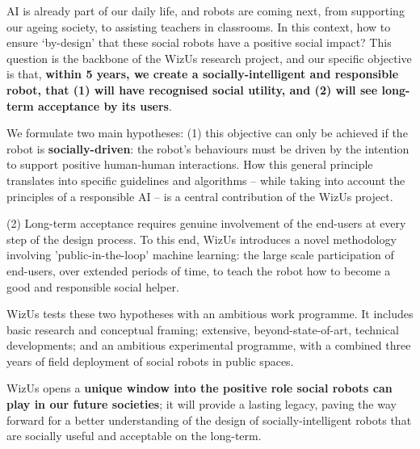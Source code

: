 \documentclass[11pt,a4paper]{report}
\newcommand{\project}{WizUs\xspace}
\begin{document}
AI is already part of our daily life, and robots are coming next, from
supporting our ageing society, to assisting teachers in classrooms. In this
context, how to ensure `by-design' that these social robots have a positive
social impact? This question is the backbone of the \project research project,
and our specific objective is that, \textbf{within 5 years, we create a
socially-intelligent and responsible robot, that (1) will have recognised social
utility, and (2) will see long-term acceptance by its users}.

We formulate two main hypotheses: (1) this objective can only be achieved if the
robot is \textbf{socially-driven}: the robot's behaviours must be driven by the
intention to support positive human-human interactions. How this general
principle translates into specific guidelines and algorithms -- while taking into
account the principles of a responsible AI -- is a central
contribution of the \project project.

(2) Long-term acceptance requires genuine involvement of the end-users at every
step of the design process. To this end, \project introduces a novel methodology
involving 'public-in-the-loop' machine learning: the large scale participation
of end-users, over extended periods of time, to teach the robot how to become a
good and responsible social helper.

\project tests these two hypotheses with an ambitious work programme. It
includes basic research and conceptual framing; extensive, beyond-state-of-art, technical
developments; and an ambitious experimental programme, with a combined three years
of field deployment of social robots in public spaces.

\project opens a \textbf{unique window into the positive role social robots can
play in our future societies}; it will provide a lasting legacy, paving the way
forward for a better understanding of the design of socially-intelligent robots
that are socially useful and acceptable on the long-term.

\newpage


\pagebreak


\newcommand{\wpOne}{Framing robot-supported human-human interaction}
\newcommand{\wpOneShort}{Framing r-HHI}
\end{document}
